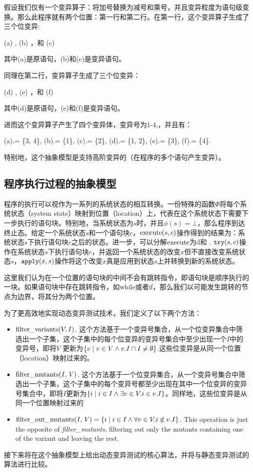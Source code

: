 \documentclass[nofonts]{ctexrep}
\begin{document}
假设我们仅有一个变异算子：将加号替换为减号和乘号，并且变异粒度为语句级变换。那么此程序就有两个位置：第一行和第二行。在第一行，这个变异算子生成了三个位变异: 

(a) , (b)
，和 (c) 

其中(a)是原语句，(b)和(c)是变异语句。

同理在第二行，变异算子生成了三个位变异：

(d) , (e)
，和 (f) 

其中(d)是原语句，(e)和(f)是变异语句。

进而这个变异算子产生了四个变异体，变异号为1-4,，并且有：

(a).\mids = \{3, 4\},
(b).\mids = \{1\}, (c).\mids = \{2\}, (d).\mids = \{1, 2\},
(e).\mids = \{3\}, (f).\mids = \{4\}.

特别地，这个抽象模型是支持高阶变异的（在程序的多个语句产生变异）。

\subsection{程序执行过程的抽象模型}
程序的执行可以视作为一系列的系统状态的相互转换。一份特殊的函数$\Phi$将每个系统状态（system state）映射到位置（location）上，代表在这个系统状态下需要下一步执行的语句块。特别地，当系统状态为$s$时，并且$\phi(s)=\bot$，那么程序到达终止态。给定一个系统状态$s$和一个语句块$c$，$\mathrm{execute}(s,c)$操作得到的结果为：系统状态$s$下执行语句块$c$之后的状态。进一步，可以分解$\mathrm{execute}$为d\try 和 \apply.
$\mathtt{try}(s, c)$操作在系统状态$s$下执行语句块$c$，并返回一个系统状态的改变$x$但不直接改变系统状态$s$，$\mathtt{apply}(x, s)$操作将这个改变$x$真是应用到状态$s$上并转换到新的系统状态。 

这里我们认为在一个位置的语句块的中间不会有跳转指令，即语句块是顺序执行的一块。如果语句块中存在跳转指令，如while或者if，那么我们以可能发生跳转的节点为边界，将其分为两个位置。

为了更高效地实现动态变异测试技术，我们定义了以下两个方法：
\begin{itemize}
\item $\mathrm{filter\_variants}(V, I)$. 这个方法基于一个变异号集合，从一个位变异集合中筛选出一个子集，这个子集中的每个位变异的变异号集合中至少出现一个$I$中的变异号，即将$V$ 更新为$\left\{v\mid v\in V \wedge v.I
  \cap I \neq \emptyset \right\}$.这些位变异是从同一个位置（location）映射过来的。
  
\item
  $\mathit{\mathrm{filter\_mutants}(I, V)}$.
这个方法基于一个位变异集合，从一个变异号集合中筛选出一个子集，这个子集中的每个变异号都至少出现在其中一个位变异的变异号集合中，即将$I$更新为$\left\{i\mid i\in I \wedge \exists v
    \in V. i \in v.I \right\}$。同样地，这些位变异是从同一个位置映射过来的
\item
  $\mathit{\mathrm{filter\_out\_mutants}(I, V)}=\left\{i\mid i\in I \wedge
     \forall v \in V. i \notin v.I \right\}$.
  This operation is just the opposite of {\it filter\_mutants},
  filtering out only the mutants containing one of the variant and
  leaving the rest.
  
\end{itemize}
接下来将在这个抽象模型上给出动态变异测试的核心算法，并将与静态变异测试的算法进行比较。
\end{document}
